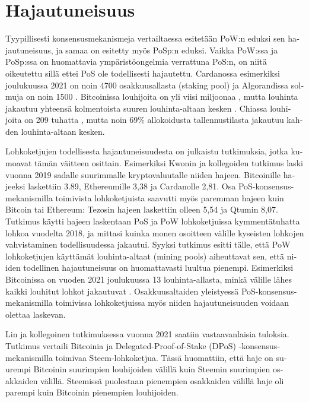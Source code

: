 \section{Hajautuneisuus\label{hajautuneisuus}}
\begin{otherlanguage}{english}

Tyypillisesti konsensusmekanismeja vertailtaessa esitetään PoW:n eduksi sen hajautuneisuus, ja samaa on esitetty myös PoSp:n eduksi. Vaikka PoW:ssa ja PoSp:ssa on huomattavia ympäristöongelmia verrattuna PoS:n, on niitä oikeutettu sillä ettei PoS ole todellisesti hajautettu. Cardanossa esimerkiksi joulukuussa 2021 on noin 4700 osakkuusallasta (staking pool) \cite{cardano-staking-pools} ja Algorandissa solmuja on noin 1500 \cite{algorand-tps-nodes-etc}. Bitcoinissa louhijoita on yli viisi miljoonaa \cite{btc-pool-stats-miner-count}, mutta louhinta jakautuu yhteensä kolmentoista suuren louhinta-altaan kesken \cite{btc-pool-stats}. Chiassa louhijoita on 209 tuhatta \cite{chia-pool-stats}, mutta noin 69\% allokoidusta tallennustilasta jakautuu kahden louhinta-altaan kesken.

Lohkoketjujen todellisesta hajautuneisuudesta on julkaistu tutkimuksia, jotka kumoavat tämän väitteen osittain. Esimerkiksi Kwonin ja kollegoiden tutkimus \cite{decentr-impossibility} laski vuonna 2019 sadalle suurimmalle kryptovaluutalle niiden hajeen. Bitcoinille hajeeksi laskettiin 3.89, Ethereumille 3,38 ja Cardanolle 2,81. Osa PoS-konsensusmekanismilla toimivista lohkoketjuista saavutti myös paremman hajeen kuin Bitcoin tai Ethereum: Tezosin hajeen laskettiin olleen 5,54 ja Qtumin 8,07. Tutkimus käytti hajeen laskentaan PoS ja PoW lohkoketjuissa kymmentätuhatta lohkoa vuodelta 2018, ja mittasi kuinka monen osoitteen välille kyseisten lohkojen vahvistaminen todellisuudessa jakautui. Syyksi tutkimus esitti tälle, että PoW lohkoketjujen käyttämät louhinta-altaat (mining pools) aiheuttavat sen, että niiden todellinen hajautuneisuus on huomattavasti luultua pienempi. Esimerkiksi Bitcoinissa on vuoden 2021 joulukuussa 13 louhinta-allasta, minkä välille lähes kaikki louhitut lohkot jakautuvat \cite{btc-pool-stats}. Osakkuusaltaiden yleistyessä PoS-konsensusmekanismilla toimivissa lohkoketjuissa myös niiden hajautuneisuuden voidaan olettaa laskevan.

Lin ja kollegoinen tutkimuksessa \cite{decentr-comparison-steem-pow} vuonna 2021 saatiin vastaavanlaisia tuloksia. Tutkimus vertaili Bitcoinia ja Delegated-Proof-of-Stake (DPoS) -konsensusmekanismilla toimivaa Steem-lohkoketjua. Tässä huomattiin, että haje on suurempi Bitcoinin suurimpien louhijoiden välillä kuin Steemin suurimpien osakkaiden välillä. Steemissä puolestaan pienempien osakkaiden välillä haje oli parempi kuin Bitcoinin pienempien louhijoiden.



\end{otherlanguage}